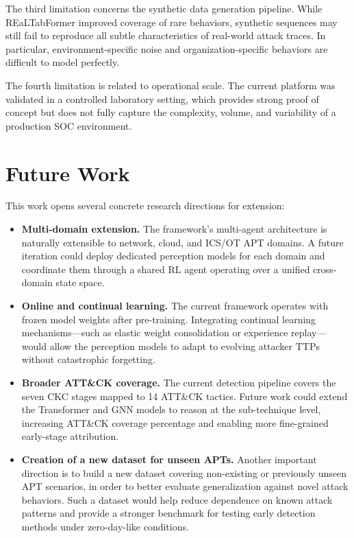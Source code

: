 The third limitation concerns the synthetic data generation pipeline. While REaLTabFormer improved coverage of rare behaviors, synthetic sequences may still fail to reproduce all subtle characteristics of real-world attack traces. In particular, environment-specific noise and organization-specific behaviors are difficult to model perfectly.

The fourth limitation is related to operational scale. The current platform was validated in a controlled laboratory setting, which provides strong proof of concept but does not fully capture the complexity, volume, and variability of a production SOC environment.

\section{Future Work}

This work opens several concrete research directions for extension:

\begin{itemize}
    \item \textbf{Multi-domain extension.} The framework's multi-agent architecture is naturally extensible to network, cloud, and ICS/OT APT domains. A future iteration could deploy dedicated perception models for each domain and coordinate them through a shared RL agent operating over a unified cross-domain state space.

    \item \textbf{Online and continual learning.} The current framework operates with frozen model weights after pre-training. Integrating continual learning mechanisms---such as elastic weight consolidation or experience replay---would allow the perception models to adapt to evolving attacker TTPs without catastrophic forgetting.

    \item \textbf{Broader ATT\&CK coverage.} The current detection pipeline covers the seven CKC stages mapped to 14 ATT\&CK tactics. Future work could extend the Transformer and GNN models to reason at the sub-technique level, increasing ATT\&CK coverage percentage and enabling more fine-grained early-stage attribution.

    \item \textbf{Creation of a new dataset for unseen APTs.} Another important direction is to build a new dataset covering non-existing or previously unseen APT scenarios, in order to better evaluate generalization against novel attack behaviors. Such a dataset would help reduce dependence on known attack patterns and provide a stronger benchmark for testing early detection methods under zero-day-like conditions.
\end{itemize}

